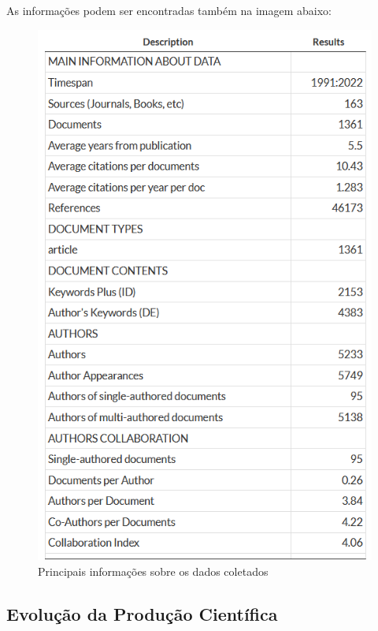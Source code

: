 As informações podem ser encontradas também na imagem abaixo:

\begin{figure}[ht]
    \centering
    \includegraphics[width=12cm]{experiments/enzoyoshio/AnaliseBibliometrica/mainInformation.PNG}
    \caption{ Principais informações sobre os dados coletados }
    \label{fig:mainInfo}
\end{figure}


\subsection{Evolução da Produção Científica}

